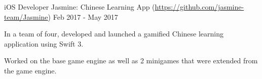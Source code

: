 

\begin{cventries}

  \cventry
  {iOS Developer} %
  {Jasmine: Chinese Learning App (\url{https://github.com/jasmine-team/Jasmine})} %
  {} %
  {Feb 2017 - May 2017} %
  {
    \begin{cvitems} %
    \item {In a team of four, developed and launched a gamified Chinese learning application using Swift 3.}
    \item {Worked on the base game engine as well as 2 minigames that were extended from the game engine.}
    \end{cvitems}
  }



\end{cventries}

